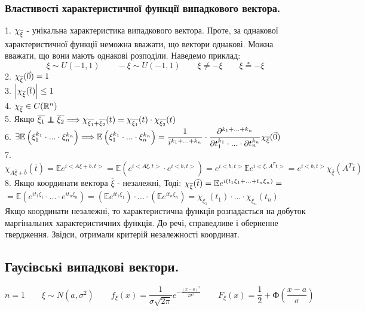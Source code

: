 \subsubsection{Властивості характеристичної функції випадкового вектора.}
1. $\chi_{\overline{\xi}} $ - унікальна характеристика випадкового вектора. Проте, за однакової характеристичної функції неможна вважати, що вектори однакові. Можна вважати, що вони мають однакові розподіли. Наведемо приклад:
$$
\xi \sim U(-1, 1) \qquad - \xi \sim U(-1, 1) \qquad \xi \neq - \xi \qquad \xi \circeq -\xi
$$
2. $\chi_{\overline{\xi}} (\vec{0}) = 1$\\
3. $ \left| \chi_{\overline{\xi}} (\overline{t}) \right| \leq 1 $\\
4. $\chi_{\overline{\xi}} \in C(\mathbb{R}^n)$\\
5. Якщо $ \overline{\xi_1 } \independent \overline{\xi_2} \Longrightarrow
\chi_{\overline{\xi_1} + \overline{\xi_2}} (t) = \chi_{\overline{\xi_1}} (t) \cdot \chi_{\overline{\xi_2}} (t)$\\
6. $ \exists \mathbb{E} \left( \xi_1^{k_1}\cdot ... \cdot \xi_n^{k_n} \right)   \Longrightarrow
\mathbb{E} \left( \xi_1^{k_1}\cdot ... \cdot \xi_n^{k_n} \right)   =
\dfrac{1}{ i^{k_1 + ... + k_n}} \cdot
\dfrac{\partial^{ k_1 + ... + k_n}}{\partial t_1^{k_1} \cdot ...\cdot \partial t_n^{k_n}} \chi_{\overline{\xi}} (\vec{0})  $\\
7. $ \chi_{A \overline{\xi} + \overline{b}} (\overline{t}) = \mathbb{E} e^{ i <A \overline{\xi} + \overline{b}, \overline{t}>} =
 \mathbb{E}  \left( e^{ i <A \overline{\xi}, \overline{t}>} \cdot e^{ i <\overline{b}, \overline{t}>} \right) =
 e^{ i <\overline{b}, \overline{t}>}  \mathbb{E}  e^{ i <\overline{\xi}, A^T \overline{t}>}  =
 e^{ i <\overline{b}, \overline{t}>}  \chi_{\overline{\xi}} \left( A^T \overline{t} \right)
	$\\
	8. Якщо координати вектора $\overline{\xi}$ - незалежні, Тоді: $
	\chi_{\overline{\xi}} (\overline{t}) = \mathbb{E} e^{i ( t_1 \xi_1 + ... + t_n \xi_n)} =$ \\$ =
	\mathbb{E} \left( e^{it_1 \xi_1 }\cdot ... \cdot e^{it_n \xi_n } \right)  = \left( \mathbb{E} e^{it_1 \xi_1 } \right) \cdot ... \cdot \left( \mathbb{E} e^{it_n \xi_n } \right) = \chi_{\xi_1} (t_1) \cdot ... \cdot \chi_{\xi_n}(t_n)
	$\\
	Якщо координати незалежні, то характеристична функція розпадається на добуток маргінальних характеристичних функція. До речі, справедливе і оберненне твердження. Звідси, отримали критерій незалежності координат.
	\def\Laplas{\text{Ф}}
	\subsection{Гаусівські випадкові вектори.}
	$$ n= 1 \qquad \xi \sim N(a, \sigma^2)  \qquad f_{\xi} ( x)  = \frac{1}{\sigma\sqrt{2\pi} } e^{- \frac{(x-a)^2}{2\sigma^2} }  \qquad F_{\xi} (x) = \frac{1}{2}  + \Laplas \left( \frac{x-a}{\sigma}  \right)  $$

